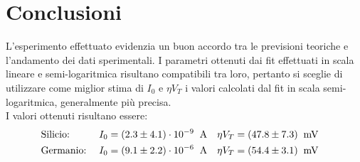 \documentclass[@SRC@/main]{subfiles}
\begin{document}
\section{Conclusioni} \label{sec:conclusioni}

  L'esperimento effettuato evidenzia un buon accordo tra le previsioni teoriche e l'andamento dei dati sperimentali.
  I parametri ottenuti dai fit effettuati in scala lineare e semi-logaritmica risultano compatibili tra loro,
  pertanto si sceglie di utilizzare come miglior stima di $I_{0}$ e $\eta V_{T}$
  i valori calcolati dal fit in scala semi-logaritmica, generalmente più precisa.
  \\[1\baselineskip]
  I valori ottenuti risultano essere:
  \begin{align*}
    &\textnormal{Silicio:} \;
    &I_{0} &= (2.3 \pm 4.1)\cdot 10^{-9} \;\;\textnormal{A} &
    \eta V_{T} &= (47.8 \pm 7.3)\;\;\textnormal{mV} & \\
    &\textnormal{Germanio:} \;
    &I_{0} &= (9.1\pm 2.2) \cdot 10^{-6} \;\;\textnormal{A} &
    \eta V_{T} &= (54.4 \pm 3.1)\;\;\textnormal{mV} &
  \end{align*}
\end{document}
